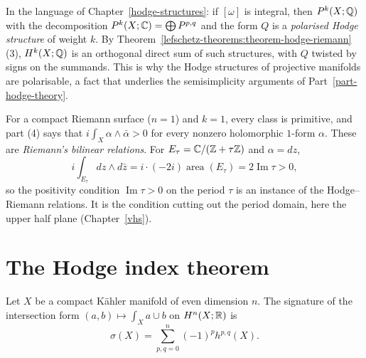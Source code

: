 \begin{remark}\label{lefschetz-theorems:remark-polarisation}
In the language of Chapter~\ref{hodge-structures}: if $[\omega]$ is integral, then $P^k(X; \mathbb{Q})$ with the decomposition
$P^k(X; \mathbb{C}) = \bigoplus P^{p,q}$ and the form $Q$ is a \emph{polarised Hodge structure} of weight $k$. By
Theorem~\ref{lefschetz-theorems:theorem-hodge-riemann}(3), $H^k(X; \mathbb{Q})$ is an orthogonal direct sum of such structures, with $Q$ twisted by
signs on the summands. This is why the Hodge structures of projective manifolds are polarisable, a fact that underlies the semisimplicity
arguments of Part~\ref{part-hodge-theory}.
\end{remark}

\begin{example}\label{lefschetz-theorems:example-curves-riemann}
For a compact Riemann surface ($n = 1$) and $k = 1$, every class is primitive, and part (4) says that $i\int_X\alpha \wedge \bar\alpha > 0$ for
every nonzero holomorphic $1$-form $\alpha$. These are \emph{Riemann's bilinear relations}. For $E_\tau = \mathbb{C}/(\mathbb{Z} + \tau\mathbb{Z})$ and $\alpha = dz$,
\[
i\int_{E_\tau}dz \wedge d\bar z = i\cdot(-2i)\operatorname{area}(E_\tau) = 2\operatorname{Im}\tau > 0,
\]
so the positivity condition $\operatorname{Im}\tau > 0$ on the period $\tau$ is an instance of the Hodge--Riemann relations. It is the
condition cutting out the period domain, here the upper half plane (Chapter~\ref{vhs}).
\end{example}

\section{The Hodge index theorem}\label{lefschetz-theorems:section-hodge-index}

\begin{theorem}\label{lefschetz-theorems:theorem-hodge-index}
Let $X$ be a compact K\"ahler manifold of even dimension $n$. The signature of the intersection form $(a, b) \mapsto \int_Xa \cup b$ on
$H^n(X; \mathbb{R})$ is
\[
\sigma(X) = \sum_{p,q = 0}^n(-1)^ph^{p,q}(X).
\]
\end{theorem}

